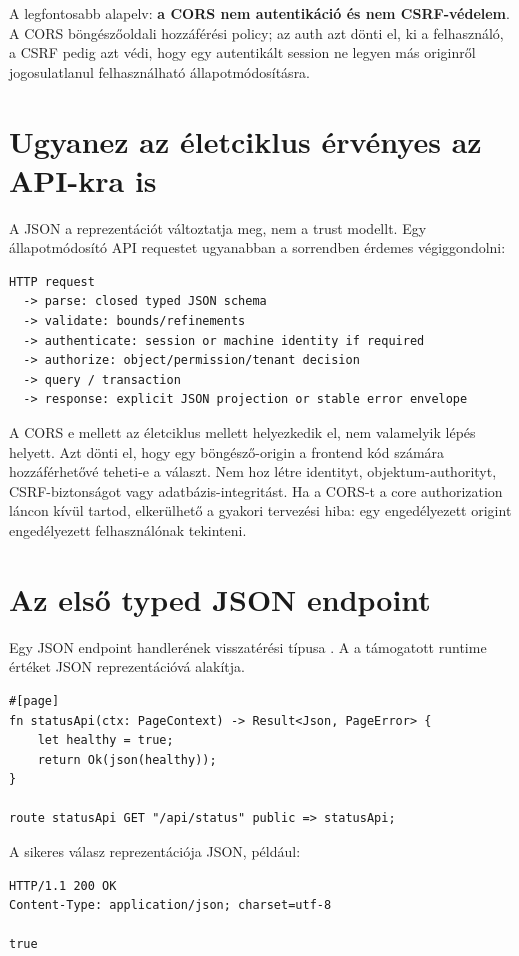 A legfontosabb alapelv: \textbf{a CORS nem autentikáció és nem CSRF-védelem}. A CORS böngészőoldali hozzáférési policy; az auth azt dönti el, ki a felhasználó, a CSRF pedig azt védi, hogy egy autentikált session ne legyen más originről jogosulatlanul felhasználható állapotmódosításra.

\section{Ugyanez az életciklus érvényes az API-kra is}

A JSON a reprezentációt változtatja meg, nem a trust modellt. Egy állapotmódosító API requestet ugyanabban a sorrendben érdemes végiggondolni:

\begin{lstlisting}
HTTP request
  -> parse: closed typed JSON schema
  -> validate: bounds/refinements
  -> authenticate: session or machine identity if required
  -> authorize: object/permission/tenant decision
  -> query / transaction
  -> response: explicit JSON projection or stable error envelope
\end{lstlisting}

A CORS e mellett az életciklus mellett helyezkedik el, nem valamelyik lépés helyett. Azt dönti el, hogy egy böngésző-origin a frontend kód számára hozzáférhetővé teheti-e a választ. Nem hoz létre identityt, objektum-authorityt, CSRF-biztonságot vagy adatbázis-integritást. Ha a CORS-t a core authorization láncon kívül tartod, elkerülhető a gyakori tervezési hiba: egy engedélyezett origint engedélyezett felhasználónak tekinteni.

\section{Az első typed JSON endpoint}

Egy JSON endpoint handlerének visszatérési típusa . A  a támogatott runtime értéket JSON reprezentációvá alakítja.

\begin{lstlisting}[language=Velran]
#[page]
fn statusApi(ctx: PageContext) -> Result<Json, PageError> {
    let healthy = true;
    return Ok(json(healthy));
}

route statusApi GET "/api/status" public => statusApi;
\end{lstlisting}

A sikeres válasz reprezentációja JSON, például:

\begin{lstlisting}
HTTP/1.1 200 OK
Content-Type: application/json; charset=utf-8

true
\end{lstlisting}

